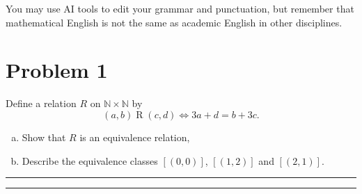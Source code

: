 \documentclass{article}
\theoremstyle{definition}
\newenvironment{solution}{\bigskip\hrule{\hfill}}{\bigskip\hrule{\hfill}} %
\begin{document}
You may use AI tools to edit your grammar and punctuation, but remember that mathematical English is not the same as academic English in other disciplines. 

\vfill

\newpage


\section*{Problem 1}
Define a relation $R$ on $\mathbb{N}\times\mathbb{N}$ by $$\left(a,b\right)\mathrel{R}\left(c,d\right)\Longleftrightarrow3a+d=b+3c.$$
\begin{enumerate}[a)] %
    \item Show that $R$ is an equivalence relation,
    \item Describe the equivalence classes $\left[\left(0,0\right)\right]$, $\left[\left(1,2\right)\right]$ and $\left[\left(2,1\right)\right]$.
\end{enumerate}
\begin{solution}


\end{solution}


\newpage

\end{document}

